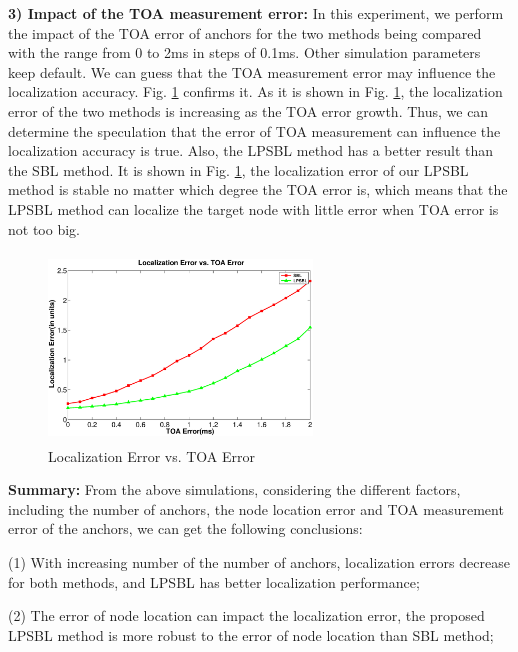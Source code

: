 \textbf{3) Impact of the TOA measurement error:}
In this experiment, we perform the impact of the TOA error of anchors for the two methods being compared with the range from 0 to 2ms in steps of 0.1ms. 
Other simulation parameters keep default. 
We can guess that the TOA measurement error may influence the localization accuracy. 
Fig. \ref{fig6} confirms it. As it is shown in Fig. \ref{fig6}, the localization error of the  two methods is increasing as the TOA error growth. 
Thus, we can determine the speculation that the error of TOA measurement can influence the localization accuracy is true. 
Also, the LPSBL method has a better result than the SBL method. 
It is shown in Fig. \ref{fig6}, the localization error of our LPSBL method is stable no matter which degree the TOA error is, which means that the LPSBL method can localize the target node with little error when TOA error is not too big.
  \begin{figure}[htb]       
			\vspace{-15mm}
            \includegraphics[height=5.0cm,width=7.0cm]{image/fig6.eps}
           \vspace{15mm}
            \caption{Localization Error vs. TOA Error}
             \vspace{-5mm}
             \label{fig6}
        \end{figure}
 \textbf{Summary:} From the above simulations, considering the different factors, including the number of anchors, the node location error and TOA measurement error of the anchors, we can get the following conclusions:

 (1) With increasing number of the number of anchors, localization errors decrease for both methods, and LPSBL has better localization performance;

 (2) The error of node location can impact the localization error, the proposed LPSBL method is more robust to the error of node location than SBL method;
 
